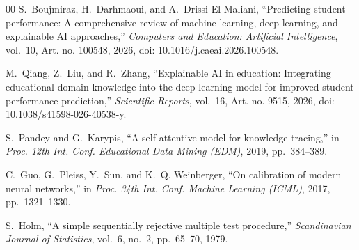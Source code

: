 \begin{thebibliography}{00}
S.~Boujmiraz, H.~Darhmaoui, and A.~Drissi El Maliani, ``Predicting student performance: A
comprehensive review of machine learning, deep learning, and explainable AI approaches,''
\emph{Computers and Education: Artificial Intelligence}, vol.~10, Art. no. 100548, 2026,
doi: 10.1016/j.caeai.2026.100548.

M.~Qiang, Z.~Liu, and R.~Zhang, ``Explainable AI in education: Integrating educational
domain knowledge into the deep learning model for improved student performance
prediction,'' \emph{Scientific Reports}, vol.~16, Art. no. 9515, 2026, doi:
10.1038/s41598-026-40538-y.

S.~Pandey and G.~Karypis, ``A self-attentive model for knowledge tracing,'' in
\emph{Proc. 12th Int. Conf. Educational Data Mining (EDM)}, 2019, pp.~384--389.

C.~Guo, G.~Pleiss, Y.~Sun, and K.~Q. Weinberger, ``On calibration of modern neural
networks,'' in \emph{Proc. 34th Int. Conf. Machine Learning (ICML)}, 2017,
pp.~1321--1330.

S.~Holm, ``A simple sequentially rejective multiple test procedure,''
\emph{Scandinavian Journal of Statistics}, vol.~6, no.~2, pp.~65--70, 1979.

\end{thebibliography}


